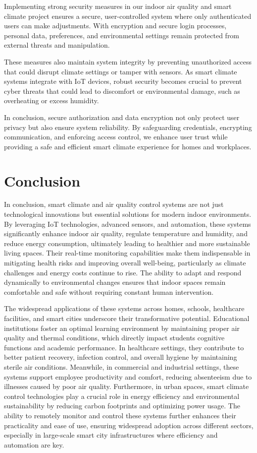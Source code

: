 \documentclass[a4paper]{scrartcl}
\begin{document}
Implementing strong security measures in our indoor air quality and smart climate project ensures a secure, user-controlled system where only authenticated users can make adjustments. With encryption and secure login processes, personal data, preferences, and environmental settings remain protected from external threats and manipulation.

These measures also maintain system integrity by preventing unauthorized access that could disrupt climate settings or tamper with sensors. As smart climate systems integrate with IoT devices, robust security becomes crucial to prevent cyber threats that could lead to discomfort or environmental damage, such as overheating or excess humidity.

In conclusion, secure authorization and data encryption not only protect user privacy but also ensure system reliability. By safeguarding credentials, encrypting communication, and enforcing access control, we enhance user trust while providing a safe and efficient smart climate experience for homes and workplaces.


\section{Conclusion}
In conclusion, smart climate and air quality control systems are not just technological innovations but essential solutions for modern indoor environments. By leveraging IoT technologies, advanced sensors, and automation, these systems significantly enhance indoor air quality, regulate temperature and humidity, and reduce energy consumption, ultimately leading to healthier and more sustainable living spaces. Their real-time monitoring capabilities make them indispensable in mitigating health risks and improving overall well-being, particularly as climate challenges and energy costs continue to rise. The ability to adapt and respond dynamically to environmental changes ensures that indoor spaces remain comfortable and safe without requiring constant human intervention.

The widespread applications of these systems across homes, schools, healthcare facilities, and smart cities underscore their transformative potential. Educational institutions foster an optimal learning environment by maintaining proper air quality and thermal conditions, which directly impact students cognitive functions and academic performance. In healthcare settings, they contribute to better patient recovery, infection control, and overall hygiene by maintaining sterile air conditions. Meanwhile, in commercial and industrial settings, these systems support employee productivity and comfort, reducing absenteeism due to illnesses caused by poor air quality. Furthermore, in urban spaces, smart climate control technologies play a crucial role in energy efficiency and environmental sustainability by reducing carbon footprints and optimizing power usage. The ability to remotely monitor and control these systems further enhances their practicality and ease of use, ensuring widespread adoption across different sectors, especially in large-scale smart city infrastructures where efficiency and automation are key.
\end{document}
